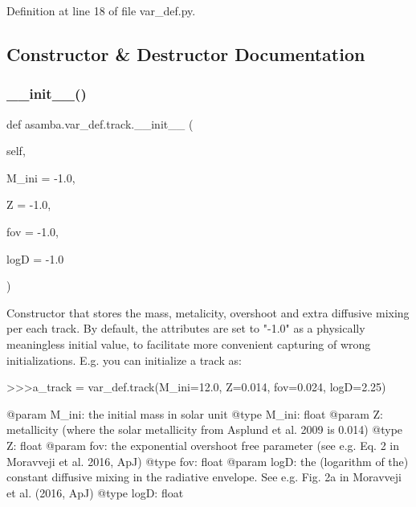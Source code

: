 Definition at line 18 of file var\+\_\+def.\+py.



\subsection{Constructor \& Destructor Documentation}
\mbox{\label{classasamba_1_1var__def_1_1track_a4b2441ffcfecbec92fb57d7d57aa3939}} 
\subsubsection{\texorpdfstring{\+\_\+\+\_\+init\+\_\+\+\_\+()}{\_\_init\_\_()}}
{\footnotesize\ttfamily def asamba.\+var\+\_\+def.\+track.\+\_\+\+\_\+init\+\_\+\+\_\+ (\begin{DoxyParamCaption}\item[{}]{self,  }\item[{}]{M\+\_\+ini = {\ttfamily -\/1.0},  }\item[{}]{Z = {\ttfamily -\/1.0},  }\item[{}]{fov = {\ttfamily -\/1.0},  }\item[{}]{logD = {\ttfamily -\/1.0} }\end{DoxyParamCaption})}

\begin{DoxyVerb}Constructor that stores the mass, metalicity, overshoot and extra diffusive mixing per each 
track. By default, the attributes are set to "-1.0" as a physically meaningless initial value,
to facilitate more convenient capturing of wrong initializations. E.g. you can initialize a track
as:

>>>a_track = var_def.track(M_ini=12.0, Z=0.014, fov=0.024, logD=2.25)

@param M_ini: the initial mass in solar unit
@type M_ini: float
@param Z: metallicity (where the solar metallicity from Asplund et al. 2009 is 0.014)
@type Z: float
@param fov: the exponential overshoot free parameter (see e.g. Eq. 2 in Moravveji et al.
   2016, ApJ)
@type fov: float
@param logD: the (logarithm of the) constant diffusive mixing in the radiative envelope.
   See e.g. Fig. 2a in Moravveji et al. (2016, ApJ)
@type logD: float
\end{DoxyVerb}
 

